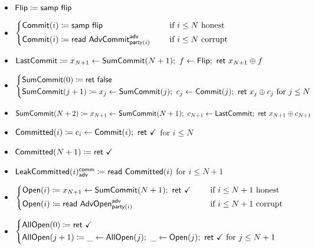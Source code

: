 \begin{itemize}
\item $\mathsf{Flip} \coloneqq \mathsf{samp} \ \mathsf{flip}$
\item {\color{blue} $\begin{cases*} \Commit(i) \coloneqq \samp{\flip} & \hspace{10pt} \text{if $i \leq N$ honest} \\ \Commit(i) \coloneqq \read{\AdvCommit^\adv_{\party(i)}} & \hspace{10pt} \text{if $i \leq N$ corrupt} \end{cases*}$}
\item {\color{blue} $\mathsf{LastCommit} \coloneqq x_{N+1} \leftarrow \mathsf{SumCommit}(N+1); \ f \leftarrow \mathsf{Flip}; \ \mathsf{ret} \ x_{N+1} \oplus f$}
\item {\color{blue} $\begin{cases*} \SumCommit(0) \coloneqq \ret{\false} \\ \SumCommit(j+1) \coloneqq x_j \leftarrow \SumCommit(j); \ c_j \leftarrow \Commit(j); \ \ret{x_j \oplus c_j} \text{ for $j \leq N$} \end{cases*}$}
\item {\color{blue} $\SumCommit(N+2) \coloneqq x_{N+1} \leftarrow \SumCommit(N+1); \ c_{N+1} \leftarrow \LastCommit; \ \ret{x_{N+1} \oplus c_{N+1}}$}
\item {\color{magenta} $\mathsf{Committed}(i) \coloneqq c_i \leftarrow \mathsf{Commit}(i); \ \mathsf{ret} \ \checkmark$ for $i \leq N$}
\item {\color{magenta} $\mathsf{Committed}(N+1) \coloneqq \mathsf{ret} \ \checkmark$}
\item {\color{magenta} $\mathsf{LeakCommitted}(i)^{\mathsf{comm}}_{\mathsf{adv}} \coloneqq \mathsf{read} \ \mathsf{Committed}(i)$ for $i \leq N+1$}
\item {\color{teal} $\begin{cases*} \Open(i) \coloneqq x_{N+1} \leftarrow \SumCommit(N+1); \ \ret{\checkmark} & \hspace{10pt} \text{if $i \leq N+1$ honest} \\ \Open(i) \coloneqq \read{\AdvOpen^\adv_{\party(i)}} & \hspace{10pt} \text{if $i \leq N+1$ corrupt} \end{cases*}$}
\item {\color{teal} $\begin{cases*} \AllOpen(0) \coloneqq \ret{\checkmark} \\ \AllOpen(j+1) \coloneqq \_ \leftarrow \AllOpen(j); \ \_ \leftarrow \Open(j); \ \ret{\checkmark} \text{ for $j \leq N+1$} \end{cases*}$}

\end{itemize}
